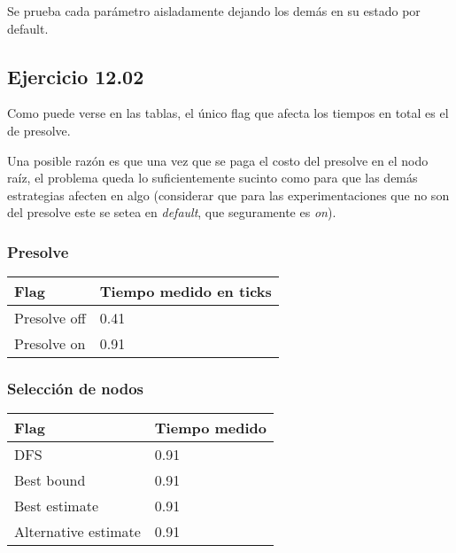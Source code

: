 Se prueba cada parámetro aisladamente dejando los demás en su estado por default.

\subsection{Ejercicio 12.02}
Como puede verse en las tablas, el único flag que afecta los tiempos en total es el de presolve.

Una posible razón es que una vez que se paga el costo del presolve en el nodo raíz, el problema queda lo suficientemente sucinto como para que las demás estrategias afecten en algo (considerar que para las experimentaciones que no son del presolve este se setea en \emph{default}, que seguramente es \emph{on}).

\subsubsection{Presolve}

    \begin{center}
        \begin{tabular}{ | m{7em} | m{5cm} | }
        \hline
        Flag & Tiempo medido en ticks \\
        \hline
        Presolve off & 0.41 \\
        \hline
        Presolve on & 0.91 \\
        \hline
        \end{tabular}
    \end{center}

\subsubsection{Selección de nodos}

    \begin{center}
        \begin{tabular}{ | m{11em} | m{5cm} | }
        \hline
        Flag & Tiempo medido \\
        \hline
        DFS & 0.91 \\
        \hline
        Best bound & 0.91 \\
        \hline
        Best estimate & 0.91 \\
        \hline
        Alternative estimate & 0.91 \\
        \hline
        \end{tabular}
    \end{center}


